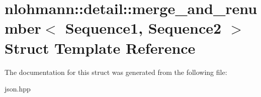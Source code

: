 \hypertarget{structnlohmann_1_1detail_1_1merge__and__renumber}{}\section{nlohmann\+:\+:detail\+:\+:merge\+\_\+and\+\_\+renumber$<$ Sequence1, Sequence2 $>$ Struct Template Reference}
\label{structnlohmann_1_1detail_1_1merge__and__renumber}


The documentation for this struct was generated from the following file\+:\begin{DoxyCompactItemize}
\item 
json.\+hpp\end{DoxyCompactItemize}
